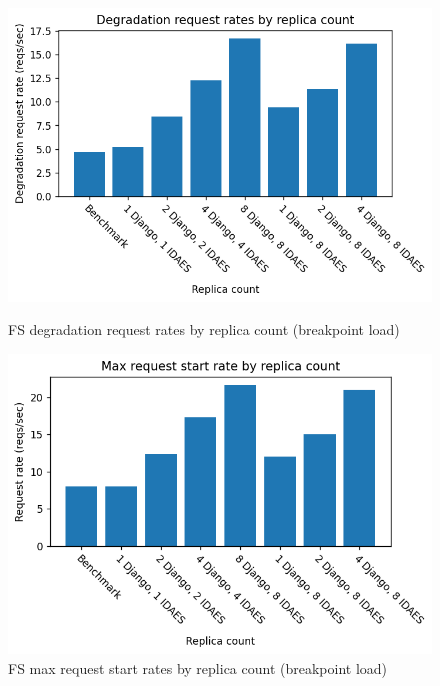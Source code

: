 \begin{figure}[h]
    \centering
    \begin{minipage}{.45\textwidth}
        \centering
        \includegraphics[width=\linewidth]{figures/fs-replica-count-degradation-request-breakpoint.png}
        \caption{FS degradation request rates by replica count (breakpoint load)}
        \label{figure:fs-replica-count-deg-comp-breakpoint}
    \end{minipage}%
    \hspace{0.05\textwidth} %
    \begin{minipage}{.45\textwidth}
      \centering
      \includegraphics[width=\linewidth]{figures/fs-replica-count-max-requests-breakpoint.png}

      \caption{FS max request start rates by replica count (breakpoint load)}
      \label{figure:fs-replica-count-breakpoint-max-start-rates}
    \end{minipage}
\end{figure}

